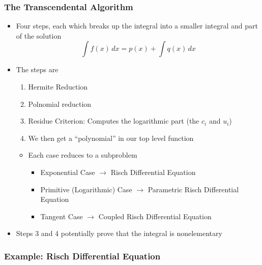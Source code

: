 \documentclass{beamer}
\numberwithin{equation}{section} %
\begin{document}
\begin{frame}
    \frametitle{The Transcendental Algorithm}
    \begin{itemize}
        \item Four steps, each which breaks up the integral into a
        smaller integral and part of the solution
        \begin{equation}
        \label{smaller integral}
        \int{f(x)\,dx} = p(x) + \int{q(x)\,dx}
        \end{equation}
        \pause
        \item The steps are 
            \begin{enumerate}
                \item Hermite Reduction
                \item Polnomial reduction
                \item Residue Criterion: Computes the logarithmic part
                (the $c_i$ and $u_i$)
                \item We then get a ``polynomial'' in our top level
                function
            \end{enumerate}
            \pause
            \begin{itemize}
                \item Each case reduces to a subproblem
                    \begin{itemize}
                        \item Exponential Case $\longrightarrow$ Risch
                        Differential Equation
                        \item Primitive (Logarithmic) Case
                        $\longrightarrow$ Parametric Risch Differential
                        Equation
                        \item Tangent Case $\longrightarrow$ Coupled
                        Risch Differential Equation
                    \end{itemize}
            \end{itemize}
    \pause
    \item Steps 3 and 4 potentially prove that the integral is nonelementary
    \end{itemize}
\end{frame}

\subsubsection{Example: Risch Differential Equation}
\end{document}
